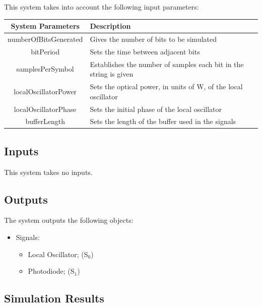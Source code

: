 This system takes into account the following input parameters:
\begin{table}[H]
\centering
\begin{tabulary}{1.0\textwidth}{|C|L|}
\hline
\textbf{System Parameters} & \textbf{Description}\\
\hline
numberOfBitsGenerated   & Gives the number of bits to be simulated\\
\hline
bitPeriod               & Sets the time between adjacent bits\\
\hline
samplesPerSymbol        & Establishes the number of samples each bit in the string is given\\
\hline
localOscillatorPower    & Sets the optical power, in units of W, of the local oscillator\\
\hline
localOscillatorPhase    & Sets the initial phase of the local oscillator\\
\hline
bufferLength            & Sets the length of the buffer used in the signals\\
\hline
\end{tabulary}
\end{table}        

\subsection*{Inputs}

This system takes no inputs.

\pagebreak
\subsection*{Outputs}

The system outputs the following objects:
\begin{itemize}
\item Signals:
\begin{itemize}
\item Local Oscillator; (S$_{0}$)
\item Photodiode; (S$_{1}$)
\end{itemize}
\end{itemize}    





\subsection*{Simulation Results}\label{subsec:SHresults}




%
